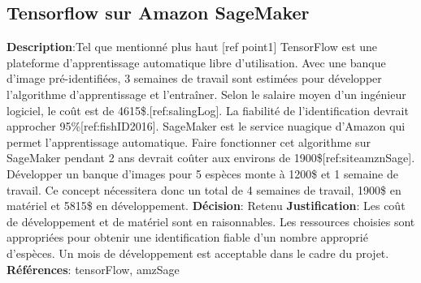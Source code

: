 

\subsection{Tensorflow sur Amazon SageMaker}
\label{s:identifier_conc2}

\textbf{Description}:Tel que mentionné plus haut [ref point1] TensorFlow est une plateforme d’apprentissage automatique libre d’utilisation.  Avec une banque d’image pré-identifiées, 3 semaines de travail sont estimées pour développer l'algorithme d’apprentissage et l’entraîner. Selon le salaire moyen d’un ingénieur logiciel, le coût est de 4615\$.[ref:salingLog].  La fiabilité de l’identification devrait approcher 95\%[ref:fishID2016]. SageMaker est le service nuagique d’Amazon qui permet l’apprentissage automatique. Faire fonctionner cet algorithme sur SageMaker pendant 2 ans devrait coûter aux environs de 1900\$[ref:siteamznSage]. Développer un banque d’images pour 5 espèces monte à 1200\$ et 1 semaine de travail. Ce concept nécessitera donc un total de 4 semaines de travail, 1900\$ en matériel et 5815\$ en développement.
\textbf{Décision}: Retenu
\textbf{Justification}: Les coût de développement et de matériel sont en raisonnables. Les ressources choisies sont appropriées pour obtenir une identification fiable d’un nombre approprié d’espèces. Un mois de développement est acceptable dans le cadre du projet.
\textbf{Références}: tensorFlow, amzSage